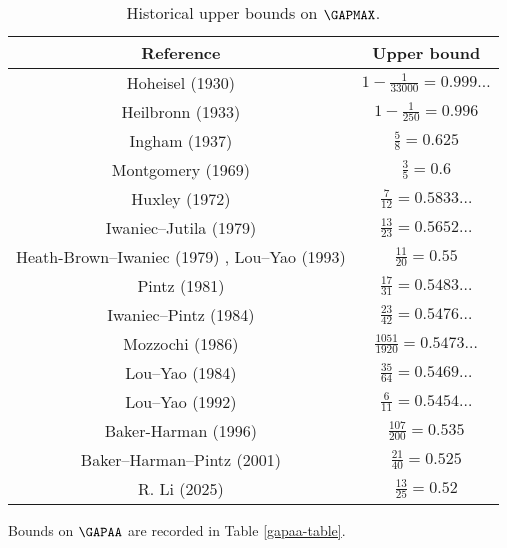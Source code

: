 \begin{table}[ht]
    \caption{Historical upper bounds on $\GAPMAX$.}
    \centering
    \renewcommand{\arraystretch}{1.2}
    \begin{tabular}{|c|c|}
    \hline
    Reference & Upper bound \\
    \hline
    Hoheisel (1930) \cite{hoheisel_1930} & $1 - \frac{1}{33000} = 0.999\dots$ \\
    \hline
    Heilbronn (1933) \cite{heilbronn_1933} & $1 - \frac{1}{250} = 0.996$ \\
    \hline
    Ingham (1937) \cite{ingham_difference_1937} & $\frac{5}{8} = 0.625$ \\
    \hline
    Montgomery (1969) \cite{montgomery_1969} & $\frac{3}{5} = 0.6$ \\
    \hline
    Huxley (1972) \cite{Huxley} & $\frac{7}{12} = 0.5833\dots$ \\
    \hline
    Iwaniec--Jutila (1979)\cite{iwaniec-jutila} & $\frac{13}{23} = 0.5652\dots$ \\
    \hline
    Heath-Brown--Iwaniec (1979) \cite{heathbrown_iwaniec_1979}, Lou--Yao (1993) \cite{lou_yao_number_1993}& $\frac{11}{20} = 0.55$ \\
    \hline
    Pintz (1981) \cite{pintz_1981} & $\frac{17}{31} = 0.5483\dots$ \\
    \hline
    Iwaniec--Pintz (1984) \cite{iwaniec-pintz} & $\frac{23}{42} = 0.5476\dots$\\
    \hline
    Mozzochi (1986) \cite{mozzochi-consecutive} & $\frac{1051}{1920} = 0.5473\dots$ \\
    \hline
    Lou--Yao (1984) \cite{LouYao3564} & $\frac{35}{64} = 0.5469\dots$\\
    \hline
    Lou--Yao (1992) \cite{lou-yao-chebychev} & $\frac{6}{11} = 0.5454\dots$\\
    \hline
    Baker-Harman (1996) \cite{baker-harman} & $\frac{107}{200} = 0.535$\\
    \hline
    Baker--Harman--Pintz (2001) \cite{baker-harman-pintz} & $\frac{21}{40} = 0.525$ \\
    \hline
    R. Li (2025) \cite{li_number_2025} & $\frac{13}{25} = 0.52$\\
    \hline
    \end{tabular}
    \end{table}\label{gapmax-table}

Bounds on $\GAPAA$ are recorded in Table \ref{gapaa-table}.

